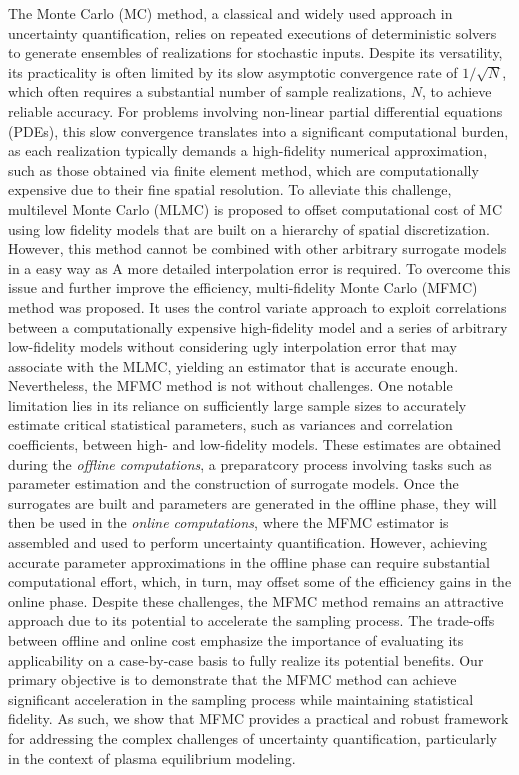 The Monte Carlo (MC) method, a classical and widely used approach in uncertainty quantification, relies on repeated executions of deterministic solvers to generate ensembles of realizations for stochastic inputs. Despite its versatility, its practicality is often limited by its slow asymptotic convergence rate of $1/\sqrt{N}$, which often requires a substantial number of sample realizations, $N$, to achieve reliable accuracy. For problems involving non-linear partial differential equations (PDEs), this slow convergence translates into a significant computational burden, as each realization typically demands a high-fidelity numerical approximation, such as those obtained via finite element method, which are computationally expensive due to their fine spatial resolution. To alleviate this challenge, multilevel Monte Carlo (MLMC) is proposed to offset computational cost of MC using low fidelity models that are built on a hierarchy of spatial discretization. However, this method cannot be combined with other arbitrary surrogate models in a easy way as A more detailed interpolation error is required. To overcome this issue and further improve the efficiency, multi-fidelity Monte Carlo (MFMC) method \cite{PeGuWi:2018,PeWiGu:2016} was proposed. It uses the control variate approach to exploit correlations between a computationally expensive high-fidelity model and a series of arbitrary low-fidelity models without considering ugly interpolation error that may associate with the MLMC, yielding an estimator that is accurate enough. Nevertheless, the MFMC method is not without challenges. One notable limitation lies in its reliance on sufficiently large sample sizes to accurately estimate critical statistical parameters, such as variances and correlation coefficients, between high- and low-fidelity models. These estimates are obtained during the \textit{offline computations}, a preparatcory process involving tasks such as parameter estimation and the construction of surrogate models. Once the surrogates are built and parameters are generated in the offline phase, they will then be used in the \textit{online computations}, where the MFMC estimator is assembled and used to perform uncertainty quantification. However, achieving accurate parameter approximations in the offline phase can require substantial computational effort, which, in turn, may offset some of the efficiency gains in the online phase. Despite these challenges, the MFMC method remains an attractive approach due to its potential to accelerate the sampling process. The trade-offs between offline and online cost emphasize the importance of evaluating its applicability on a case-by-case basis to fully realize its potential benefits.  Our primary objective is to demonstrate that the MFMC method can achieve significant acceleration in the sampling process while maintaining statistical fidelity. As such, we show that MFMC provides a practical and robust framework for addressing the complex challenges of uncertainty quantification, particularly in the context of plasma equilibrium modeling.
